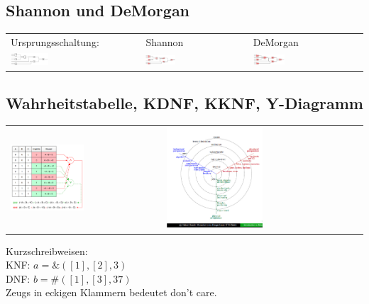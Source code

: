 \subsection{Shannon und DeMorgan}
	\begin{tabular}{lll}
	Ursprungsschaltung: & Shannon & DeMorgan\\
		\includegraphics[width=0.3\textwidth]{pics/shanonursprung} & 
		\includegraphics[width=0.3\textwidth]{pics/shanonende} &
		\includegraphics[width=0.3\textwidth]{pics/demorganende}\\
	\end{tabular}


\subsection{Wahrheitstabelle, KDNF, KKNF, Y-Diagramm}
\begin{tabular}{ll}
	\includegraphics[width=0.5\textwidth]{pics/KNFDNF} & \includegraphics[width=0.5\textwidth]{pics/ydiagramm} \\
\end{tabular}
Kurzschreibweisen:\\
KNF: $ a = \&([1],[2],3) $ \\
DNF: $ b = \#([1],[3],37) $ \\
Zeugs in eckigen Klammern bedeutet don't care.
